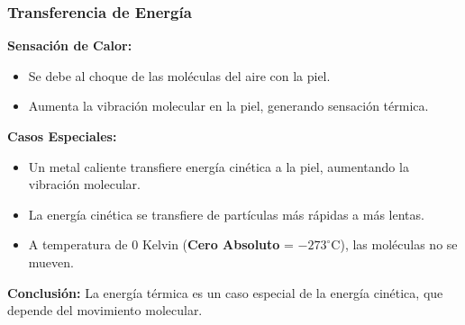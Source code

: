 \documentclass[main.tex]{subfiles}
\begin{document}
\begin{frame}
    \frametitle{Transferencia de Energía}

    \textbf{Sensación de Calor:}
    \begin{itemize}
        \item Se debe al choque de las moléculas del aire con la piel.
        \item Aumenta la vibración molecular en la piel, generando sensación térmica.
    \end{itemize}

    \vspace{0.3cm}
    \textbf{Casos Especiales:}
    \begin{itemize}
        \item Un metal caliente transfiere energía cinética a la piel, aumentando la vibración molecular.
        \item La energía cinética se transfiere de partículas más rápidas a más lentas.
        \item A temperatura de $0$ Kelvin (\textbf{Cero Absoluto} = $-273^{\circ}$C), las moléculas no se mueven.
    \end{itemize}

    \vspace{0.3cm}
    \textbf{Conclusión:} La energía térmica es un caso especial de la energía cinética, que depende del movimiento molecular.

\end{frame}
\end{document}
